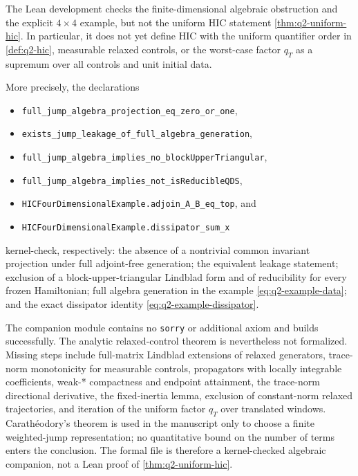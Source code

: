 \documentclass[class=article,11pt,a4paper,crop=false]{standalone}
\begin{document}
\begin{remark}
\label{rem:hic-lean}
The Lean development checks the finite-dimensional algebraic obstruction and
the explicit $4\times4$ example, but not the uniform HIC statement
\cref{thm:q2-uniform-hic}. In particular, it does not yet define HIC with the
uniform quantifier order in \cref{def:q2-hic}, measurable relaxed controls, or
the worst-case factor $q_T$ as a supremum over all controls and unit initial
data.
\par\smallskip\noindent
{}
\par\smallskip\noindent
More precisely, the declarations
\begin{itemize}[leftmargin=2em,itemsep=0pt,topsep=2pt]
  \item \nolinkurl{full_jump_algebra_projection_eq_zero_or_one},
  \item \nolinkurl{exists_jump_leakage_of_full_algebra_generation},
  \item \nolinkurl{full_jump_algebra_implies_no_blockUpperTriangular},
  \item \nolinkurl{full_jump_algebra_implies_not_isReducibleQDS},
  \item \nolinkurl{HICFourDimensionalExample.adjoin_A_B_eq_top}, and
  \item \nolinkurl{HICFourDimensionalExample.dissipator_sum_x}
\end{itemize}
kernel-check, respectively: the absence of a nontrivial common invariant
projection under full adjoint-free generation; the equivalent leakage
statement; exclusion of a block-upper-triangular Lindblad form and of
reducibility for every frozen Hamiltonian; full algebra generation in the
example \eqref{eq:q2-example-data}; and the exact dissipator identity
\eqref{eq:q2-example-dissipator}.

The companion module contains no \texttt{sorry} or additional axiom and
builds successfully. The analytic relaxed-control theorem is nevertheless not
formalized. Missing steps include full-matrix Lindblad extensions of relaxed
generators, trace-norm monotonicity for measurable controls, propagators with
locally integrable coefficients, weak-* compactness and endpoint attainment,
the trace-norm directional derivative, the fixed-inertia lemma, exclusion of
constant-norm relaxed trajectories, and iteration of the uniform factor
$q_T$ over translated windows. Carath\'eodory's theorem is used in the
manuscript only to choose a finite weighted-jump representation; no
quantitative bound on the number of terms enters the conclusion. The formal
file is therefore a kernel-checked algebraic companion, not a Lean proof of
\cref{thm:q2-uniform-hic}.
\end{remark}

\ifstandalone


\fi
\end{document}

